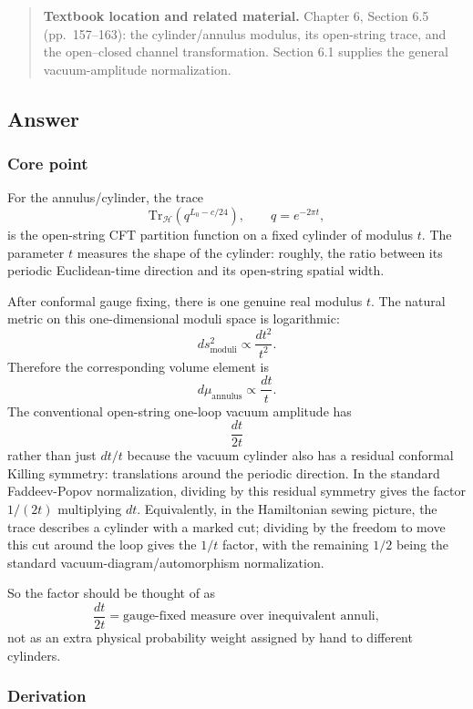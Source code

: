\documentclass[
  10pt,
  a4paper,
  openany]{book}
\begin{document}
\begin{quote}
\textbf{Textbook location and related material.} Chapter 6, Section 6.5
(pp.~157--163): the cylinder/annulus modulus, its open-string trace, and
the open--closed channel transformation. Section 6.1 supplies the
general vacuum-amplitude normalization.
\end{quote}

\subsection{Answer}\label{answer-1}

\subsubsection{Core point}\label{core-point-1}

For the annulus/cylinder, the trace \[
\mathrm{Tr}_{\mathcal H}\left(q^{L_0-c/24}\right),
\qquad
q=e^{-2\pi t},
\] is the open-string CFT partition function on a fixed cylinder of
modulus \(t\). The parameter \(t\) measures the shape of the cylinder:
roughly, the ratio between its periodic Euclidean-time direction and its
open-string spatial width.

After conformal gauge fixing, there is one genuine real modulus \(t\).
The natural metric on this one-dimensional moduli space is logarithmic:
\[
ds_{\mathrm{moduli}}^2\propto \frac{dt^2}{t^2}.
\] Therefore the corresponding volume element is \[
d\mu_{\mathrm{annulus}}\propto \frac{dt}{t}.
\] The conventional open-string one-loop vacuum amplitude has \[
\frac{dt}{2t}
\] rather than just \(dt/t\) because the vacuum cylinder also has a
residual conformal Killing symmetry: translations around the periodic
direction. In the standard Faddeev-Popov normalization, dividing by this
residual symmetry gives the factor \(1/(2t)\) multiplying \(dt\).
Equivalently, in the Hamiltonian sewing picture, the trace describes a
cylinder with a marked cut; dividing by the freedom to move this cut
around the loop gives the \(1/t\) factor, with the remaining \(1/2\)
being the standard vacuum-diagram/automorphism normalization.

So the factor should be thought of as \[
\frac{dt}{2t}
=
\text{gauge-fixed measure over inequivalent annuli},
\] not as an extra physical probability weight assigned by hand to
different cylinders.

\subsubsection{Derivation}\label{derivation-1}
\end{document}
